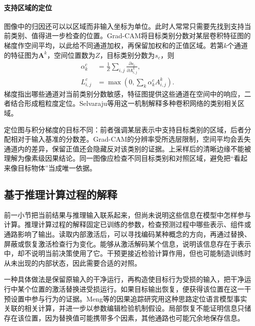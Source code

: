 \paragraph{支持区域的定位}

图像中的归因还可以以区域而非输入坐标为单位。此时人常常只需要先找到支持当前类别、值得进一步检查的位置。Grad-CAM将目标类别分数对某层卷积特征图的梯度作空间平均，以此给不同通道加权，再保留加权和的正值区域。若第$k$个通道的特征图为$\bm A^k$，空间位置数为$Z$，目标类别分数为$s_c$，则
\begin{equation}
 \begin{aligned}
 \alpha_k^c&=\frac{1}{Z}\sum_{i,j}
 \frac{\partial s_c}{\partial A^k_{i,j}},\\
 L^c_{i,j}&=\max\!\left(0,\sum_k\alpha_k^c A^k_{i,j}\right).
 \end{aligned}
 \label{eq:interpretability-gradcam}
\end{equation}
梯度指出哪些通道对当前类别分数敏感，特征图提供这些通道在空间中的响应，二者结合形成粗粒度定位。Selvaraju等用这一机制解释多种卷积网络的类别相关区域。

定位图与积分梯度的目标不同：前者强调某层表示中支持目标类别的区域，后者分配相对于输入基准的分数差。Grad-CAM的分辨率受所选层限制，空间平均会丢失通道内的差异，保留正值还会隐藏反对该类别的证据。上采样后的清晰边缘不能被理解为像素级因果结论。同一图像应检查不同目标类别和对照区域，避免把“看起来像目标物体”当成唯一依据。

\subsection{基于推理计算过程的解释}
\label{sec:interpretability-local-mechanism}

前一小节把当前结果与推理输入联系起来，但尚未说明这些信息在模型中怎样参与计算。推理计算过程的解释固定已训练的参数，检查预测过程中哪些表示、组件或通路影响了输出。读取内部激活后，可以寻找编码某种概念的方向，再通过替换、屏蔽或恢复激活检查行为变化。能够从激活解码某个信息，说明该信息存在于表示中，却不说明当前决策使用了它。干预更接近检验计算作用，但也可能制造训练时从未出现的内部状态，因此需要合适的对照。

一种具体做法是保留原输入的干净运行，再构造使目标行为受损的输入，把干净运行中某个位置的激活替换进受损运行。如果目标输出恢复，便获得该位置在这一干预设置中参与行为的证据。Meng等的因果追踪研究用这种思路定位语言模型事实关联的相关计算，并进一步以参数编辑检验机制假设。局部恢复不能证明信息只储存在该位置，因为替换值可能携带多个因素，其他通路也可能冗余地保存信息。

